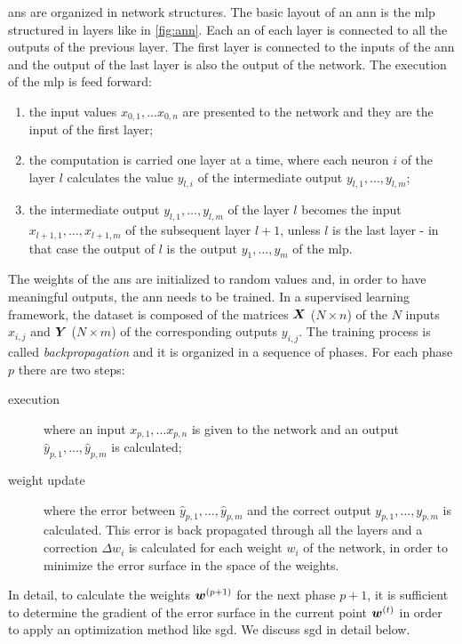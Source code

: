\acp{an} are organized in network structures. The basic layout of
an  \ac{ann} is the \acf{mlp} structured in layers like in
\cref{fig:ann}. Each \ac{an} of each layer is connected to all the
outputs of the previous layer. The first layer is connected to the
inputs of the \ac{ann} and the output of the last layer is also the
output of the network. The execution of the \ac{mlp} is feed forward:
\begin{enumerate}
\item the input values $x_{0,1},\dots x_{0,n}$ are presented to the
  network and they are the input of the first layer;
\item  the computation is 
  carried one layer at a time, where each neuron $i$ of the layer $l$
  calculates the value $y_{l,i}$ of the intermediate output
  $y_{l,1},\dots,y_{l,m}$;
\item the intermediate output $y_{l,1},\dots,y_{l,m}$ of the layer $l$
  becomes the 
  input $x_{l+1,1},\dots,x_{l+1,m}$ of the subsequent layer $l+1$,
  unless $l$ is the last layer - in that case the output of $l$ is the
  output $y_1,\dots,y_m$ of the \ac{mlp}.
\end{enumerate}

The weights of the \acp{an} are initialized to random values and, in order
to have meaningful outputs, the \ac{ann} needs to be trained. In a
supervised learning framework, the dataset is composed of the matrices
$\bm{X}$ ($N\times n$) of the $N$ inputs $x_{i,j}$ and $\bm{Y}$
($N\times m$) of 
the corresponding outputs $y_{i,j}$. The
training process is called \emph{backpropagation} and it is organized in a
sequence of phases. For each phase $p$ there are two steps:
\begin{description}
\item[execution] where an input $x_{p,1},\dots x_{p,n}$ is given to
  the network and an output $\hat{y}_{p,1},\dots,\hat{y}_{p,m}$ is calculated;
\item[weight update] where the error between
  $\hat{y}_{p,1},\dots,\hat{y}_{p,m}$ and the correct output
  $y_{p,1},\dots,y_{p,m}$ is calculated. This error is back propagated
  through all 
  the layers and a correction $\Delta w_i$ is calculated for each weight $w_i$ of
  the network, in
  order to minimize the error surface in the space of the weights.
\end{description}
In detail, to calculate the weights $\bm{w}^{(p+1)}$ for the next
phase $p+1$, it is 
sufficient to determine the gradient of 
the error surface in the current point $\bm{w}^{(t)}$ in order to
apply an optimization method like \ac{sgd}. We discuss \ac{sgd} in
detail below.

